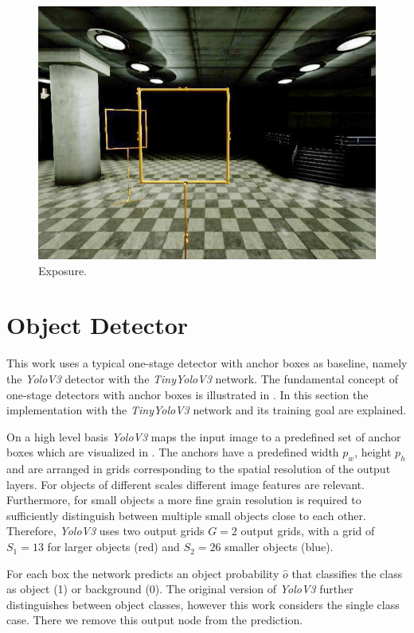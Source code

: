 \begin{figure}[htbp]
\begin{minipage}{0.33\textwidth}
		\includegraphics[width=\textwidth]{fig/gate_example_exposure}
		\caption{Exposure.}
		\label{fig:exposure}
	\end{minipage}
\end{figure}


\section{Object Detector}

This work uses a typical one-stage detector with anchor boxes as baseline, namely the \textit{YoloV3} detector with the \textit{TinyYoloV3} network. The fundamental concept of one-stage detectors with anchor boxes is illustrated in . In this section the implementation with the \textit{TinyYoloV3} network and its training goal are explained.

On a high level basis \textit{YoloV3} maps the input image to a predefined set of anchor boxes which are visualized in . The anchors have a predefined width $p_w$, height $p_h$ and are arranged in grids corresponding to the spatial resolution of the output layers. For objects of different scales different image features are relevant. Furthermore, for small objects a more fine grain resolution is required to sufficiently distinguish between multiple small objects close to each other. Therefore, \textit{YoloV3} uses two output grids $G=2$ output grids, with a grid of $S_1 =13$ for larger objects (red) and $S_2 = 26$ smaller objects (blue). 


For each box the network predicts an object probability $\hat o$ that classifies the class as object (1) or background (0). The original version of \textit{YoloV3} further distinguishes between object classes, however this work considers the single class case. There we remove this output node from the prediction. 


